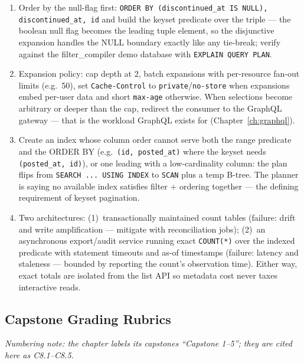 \begin{enumerate}[label=\textbf{E8.\arabic*.}, leftmargin=2.8em]
    predicate drops $(2,1)$ and $(2,2)$ (skipped rows), while the mirror bug
    \texttt{a > x OR b > y} re-admits already-seen rows (duplicates) ---
    the two distinct error modes of offset-free predicates done wrong.
  \item Order by the null-flag first: \texttt{ORDER BY (discontinued\_at IS
    NULL), discontinued\_at, id} and build the keyset predicate over the
    triple --- the boolean null flag becomes the leading tuple element, so
    the disjunctive expansion handles the NULL boundary exactly like any
    tie-break; verify against the filter\_compiler demo database with
    \texttt{EXPLAIN QUERY PLAN}.
  \item Expansion policy: cap depth at 2, batch expansions with per-resource
    fan-out limits (e.g.\ 50), set \texttt{Cache-Control} to
    \texttt{private}/\texttt{no-store} when expansions embed per-user data
    and short \texttt{max-age} otherwise. When selections become arbitrary
    or deeper than the cap, redirect the consumer to the GraphQL gateway ---
    that is the workload GraphQL exists for (Chapter~\ref{ch:graphql}).
  \item Create an index whose column order cannot serve both the range
    predicate and the ORDER BY (e.g.\ \texttt{(id, posted\_at)} where the
    keyset needs \texttt{(posted\_at, id)}), or one leading with a
    low-cardinality column: the plan flips from \texttt{SEARCH ... USING
    INDEX} to \texttt{SCAN} plus a temp B-tree. The planner is saying no
    available index satisfies filter + ordering together --- the defining
    requirement of keyset pagination.
  \item Two architectures: (1)~transactionally maintained count tables
    (failure: drift and write amplification --- mitigate with reconciliation
    jobs); (2)~an asynchronous export/audit service running exact
    \texttt{COUNT(*)} over the indexed predicate with statement timeouts
    and as-of timestamps (failure: latency and staleness --- bounded by
    reporting the count's observation time). Either way, exact totals are
    isolated from the list API so metadata cost never taxes interactive
    reads.
\end{enumerate}

\subsection{Capstone Grading Rubrics}

\emph{Numbering note: the chapter labels its capstones ``Capstone 1--5'';
they are cited here as C8.1--C8.5.}

